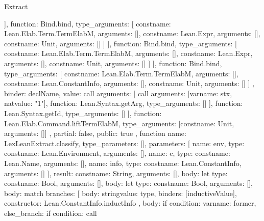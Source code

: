 \begin{lexlean}{Extract}
\begin{toolingmodule}
{{{{{{{{{{                            ],
                            function: Bind.bind,
                            type_arguments: [
                              const{name: Lean.Elab.Term.TermElabM, arguments: []},
                              const{name: Lean.Expr, arguments: []},
                              const{name: Unit, arguments: []}
                            ]
                          }
                        }
                      ],
                      function: Bind.bind,
                      type_arguments: [
                        const{name: Lean.Elab.Term.TermElabM, arguments: []},
                        const{name: Lean.Expr, arguments: []},
                        const{name: Unit, arguments: []}
                      ]
                    }
                  }
                ],
                function: Bind.bind,
                type_arguments: [
                  const{name: Lean.Elab.Term.TermElabM, arguments: []},
                  const{name: Lean.ConstantInfo, arguments: []},
                  const{name: Unit, arguments: []}
                ]
              },
              binder: declName,
              value: call{
                arguments: [
                  call{
                    arguments: [var{name: stx}, nat{value: "1"}],
                    function: Lean.Syntax.getArg,
                    type_arguments: []
                  }
                ],
                function: Lean.Syntax.getId,
                type_arguments: []
              }
            }
          ],
          function: Lean.Elab.Command.liftTermElabM,
          type_arguments: [const{name: Unit, arguments: []}]
        }
      },
      partial: false,
      public: true
    },
    function{
      name: LexLeanExtract.classify,
      type_parameters: [],
      parameters: [
        {name: env, type: const{name: Lean.Environment, arguments: []}},
        {name: c, type: const{name: Lean.Name, arguments: []}},
        {name: info, type: const{name: Lean.ConstantInfo, arguments: []}}
      ],
      result: const{name: String, arguments: []},
      body: let{
        type: const{name: Bool, arguments: []},
        body: let{
          type: const{name: Bool, arguments: []},
          body: match{
            branches: [
              {
                body: string{value: type},
                binders: [inductiveValue],
                constructor: Lean.ConstantInfo.inductInfo
              },
              {
                body: if{
                  condition: var{name: former},
                  else_branch: if{
                    condition: call{
}}}}}}}}}
\end{toolingmodule}
\end{lexlean}
